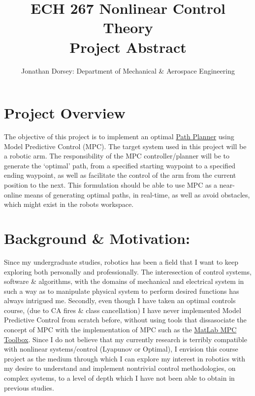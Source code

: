 \documentclass[12px]{article}
\begin{document}
    \title{ECH 267 Nonlinear Control Theory \\ Project Abstract }

    \author{Jonathan Dorsey: Department of Mechanical \& Aerospace Engineering}

    \maketitle


    \section*{Project Overview}

    The objective of this project is to implement an optimal \underline{Path Planner} using Model Predictive Control (MPC). The target system used in this project will be a robotic arm. The responsibility of the MPC controller/planner will be to generate the `optimal' path, from a specified starting waypoint to a specified ending waypoint, as well as facilitate the control of the arm from the current position to the next. This formulation should be able to use MPC as a near-online means of generating optimal paths, in real-time, as well as avoid obstacles, which might exist in the robots workspace.

    \section*{Background \& Motivation:}

    Since my undergraduate studies, robotics has been a field that I want to keep exploring both personally and professionally. The interesection of control systems, software \& algorithms, with the domains of mechanical and electrical system in such a way as to manipulate physical system to perform desired functions has always intrigued me. Secondly, even though I have taken an optimal controls course, (due to CA fires \& class cancellation) I have never implemented Model Predictive Control from scratch before, without using tools that dissasociate the concept of MPC with the implementation of MPC such as the \underline{MatLab MPC Toolbox}. Since I do not believe that my currently research is terribly compatible with nonlinear systems/control (Lyapunov or Optimal), I envision this course project as the medium through which I can explore my interest in robotics with my desire to understand and implement nontrivial control methodologies, on complex systems, to a level of depth which I have not been able to obtain in previous studies.
\end{document}
